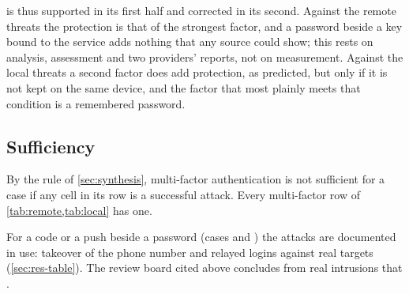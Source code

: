  is thus supported in its first half and corrected
in its second.
Against the remote threats the protection is that of the strongest
factor, and a password beside a key bound to the service adds nothing
that any source could show; this rests on analysis, assessment and two
providers' reports, not on measurement.
Against the local threats a second factor does add protection, as
predicted, but only if it is not kept on the same device, and the
factor that most plainly meets that condition is a remembered password.

\subsection{Sufficiency}\label{sec:res-sufficient}

By the rule of \cref{sec:synthesis}, multi-factor authentication is not
sufficient for a case if any cell in its row is a successful attack.
Every multi-factor row of \cref{tab:remote,tab:local} has one.

For a code or a push beside a password (cases  and )
the attacks are documented in use: takeover of the phone number and
relayed logins against real targets (\cref{sec:res-table}).
The review board cited above concludes from real intrusions that
.

